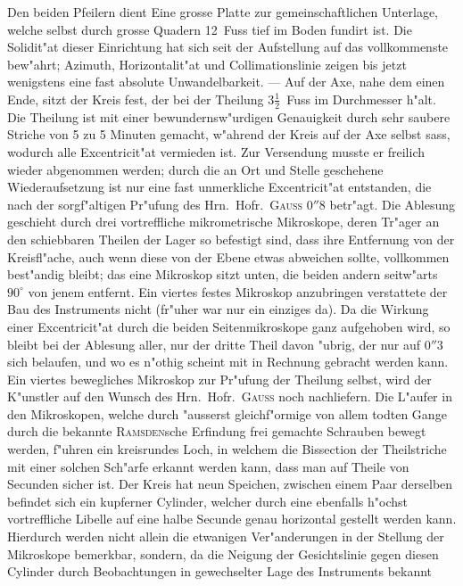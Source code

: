 \documentclass[12pt,a4paper]{article}
\begin{document}
Den beiden Pfeilern dient Eine grosse Platte zur gemeinschaftlichen Unterlage, welche selbst durch
grosse Quadern 12~Fuss tief im Boden fundirt ist. Die Solidit"at dieser Einrichtung hat sich seit der
Aufstellung auf das vollkommenste bew"ahrt; Azimuth, Horizontalit"at und Collimationslinie zeigen bis
jetzt wenigstens eine fast absolute Unwandelbarkeit. --- Auf der Axe, nahe dem einen Ende, sitzt der Kreis
fest, der bei der Theilung $3\frac{1}{2}$~Fuss im Durchmesser h"alt. Die Theilung ist mit einer bewundernsw"urdigen
Genauigkeit durch sehr saubere Striche von 5 zu 5 Minuten gemacht, w"ahrend der Kreis auf der Axe
selbst sass, wodurch alle Excentricit"at vermieden ist. Zur Versendung musste er freilich wieder abgenommen
werden; durch die an Ort und Stelle geschehene Wiederaufsetzung ist nur eine fast unmerkliche
Excentricit"at entstanden, die nach der sorgf"altigen Pr"ufung des Hrn.~Hofr.~\textsc{Gauss} $0''8$ betr"agt.
Die Ablesung geschieht durch drei vortreffliche mikrometrische Mikroskope, deren Tr"ager an den schiebbaren
Theilen der Lager so befestigt sind, dass ihre Entfernung von der Kreisfl"ache, auch wenn diese von der
Ebene etwas abweichen sollte, vollkommen best"andig bleibt; das eine Mikroskop sitzt unten, die beiden
andern seitw"arts $90^{\circ}$ von jenem entfernt. Ein viertes festes Mikroskop anzubringen verstattete der Bau
des Instruments nicht (fr"uher war nur ein einziges da). Da die Wirkung einer Excentricit"at durch die
beiden Seitenmikroskope ganz aufgehoben wird, so bleibt bei der Ablesung aller, nur der dritte Theil
davon "ubrig, der nur auf $0''3$ sich belaufen, und wo es n"othig scheint mit in Rechnung gebracht werden
kann. Ein viertes bewegliches Mikroskop zur Pr"ufung der Theilung selbst, wird der K"unstler auf den
Wunsch des Hrn.~Hofr.~\textsc{Gauss} noch nachliefern. Die L"aufer in den Mikroskopen, welche durch "ausserst
gleichf"ormige von allem todten Gange durch die bekannte \textsc{Ramsden}sche Erfindung frei gemachte Schrauben
bewegt werden, f"uhren ein kreisrundes Loch, in welchem die Bissection der Theilstriche mit einer solchen
Sch"arfe erkannt werden kann, dass man auf Theile von Secunden sicher ist. Der Kreis hat neun Speichen,
zwischen einem Paar derselben befindet sich ein kupferner Cylinder, welcher durch eine ebenfalls h"ochst
vortreffliche Libelle auf eine halbe Secunde genau horizontal gestellt werden kann. Hierdurch werden nicht
allein die etwanigen Ver"anderungen in der Stellung der Mikroskope bemerkbar, sondern, da die Neigung
der Gesichtslinie gegen diesen Cylinder durch Beobachtungen in gewechselter Lage des Instruments bekannt
\end{document}
